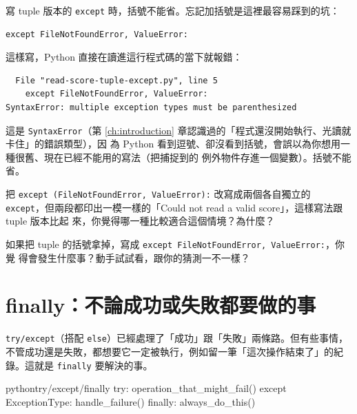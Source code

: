 寫 tuple 版本的 \texttt{except} 時，括號不能省。忘記加括號是這裡最容易踩到的坑：

\begin{verbatim}
except FileNotFoundError, ValueError:
\end{verbatim}

這樣寫，Python 直接在讀進這行程式碼的當下就報錯：

\begin{verbatim}
  File "read-score-tuple-except.py", line 5
    except FileNotFoundError, ValueError:
SyntaxError: multiple exception types must be parenthesized
\end{verbatim}

這是 \texttt{SyntaxError}（第 \ref{ch:introduction} 章認識過的「程式還沒開始執行、光讀就卡住」的錯誤類型），因
為 Python 看到逗號、卻沒看到括號，會誤以為你想用一種很舊、現在已經不能用的寫法（把捕捉到的
例外物件存進一個變數）。括號不能省。


\begin{drills}[label=drills:except-tuple]
\item 把 \texttt{except (FileNotFoundError, ValueError):} 改寫成兩個各自獨立的
\texttt{except}，但兩段都印出一模一樣的「Could not read a valid score」，這樣寫法跟 tuple 版本比起
來，你覺得哪一種比較適合這個情境？為什麼？
\item 如果把 tuple 的括號拿掉，寫成 \texttt{except FileNotFoundError, ValueError:}，你覺
得會發生什麼事？動手試試看，跟你的猜測一不一樣？
\end{drills}

\section{finally：不論成功或失敗都要做的事}
\label{sec:finally}

\texttt{try/except}（搭配 \texttt{else}）已經處理了「成功」跟「失敗」兩條路。但有些事情，
不管成功還是失敗，都想要它一定被執行，例如留一筆「這次操作結束了」的紀錄。這就是
\texttt{finally} 要解決的事。

\begin{code}{python}{try/except/finally}
try:
    operation_that_might_fail()
except ExceptionType:
    handle_failure()
finally:
    always_do_this()
\end{code}

